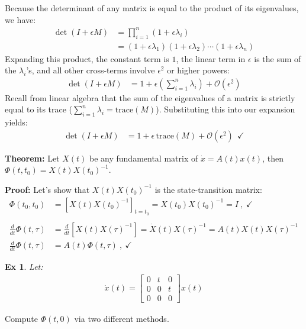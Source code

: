 \documentclass[twoside]{article}
\newtheorem{exmp}[theorem]{Ex}
\begin{document}
Because the determinant of any matrix is equal to the product of its eigenvalues, we have:
\begin{align*}
    \det(I + \epsilon M) &= \prod_{i=1}^n (1 + \epsilon \lambda_i) \\
    &= (1 + \epsilon \lambda_1)(1 + \epsilon \lambda_2) \cdots (1 + \epsilon \lambda_n) 
\end{align*}
Expanding this product, the constant term is $1$, the linear term in $\epsilon$ is the sum of the $\lambda_i$'s, and all other cross-terms involve $\epsilon^2$ or higher powers:
\begin{align*}
    \det(I + \epsilon M) &= 1 + \epsilon \left( \sum_{i=1}^n \lambda_i \right) + \mathcal{O}(\epsilon^2)
\end{align*}
Recall from linear algebra that the sum of the eigenvalues of a matrix is strictly equal to its trace ($\sum_{i=1}^n \lambda_i = \mathrm{trace}(M)$). Substituting this into our expansion yields:
\begin{align*}
    \det(I + \epsilon M) &= 1 + \epsilon \, \mathrm{trace}(M) + \mathcal{O}(\epsilon^2) \ \ \checkmark
\end{align*}
\vspace{6pt}

\textbf{Theorem:} Let $X(t)$ be any fundamental matrix of $\dot{x} = A(t) x(t)$, then $\Phi(t,t_0) = X(t) X(t_0)^{-1}$.

\textbf{Proof:} Let's show that $X(t) X(t_0)^{-1}$ is the state-transition matrix:
%
\begin{align*}
\Phi(t_0,t_0) &= \left[ X(t) X(t_0)^{-1} \right]_{t=t_0} = X(t_0) X(t_0)^{-1}= I \ , \ \checkmark
	\\
	\\
	\frac{d}{dt} \Phi(t , \tau) &= \frac{d}{dt} \left[ X(t) X(\tau)^{-1} \right] = \dot{X}(t) X(\tau)^{-1}  = A(t) X(t) X(\tau)^{-1}
	\\
	\frac{d}{dt} \Phi(t , \tau) &= A(t) \Phi(t , \tau) \ , \ \checkmark
\end{align*}

\begin{exmp}
Let:
\begin{align*}
	\dot{x}(t) = \begin{bmatrix} 0 & t & 0 \\ 0 & 0 & t \\ 0 & 0 & 0 \end{bmatrix} x(t)
\end{align*}
\end{exmp}
%
Compute $\Phi(t,0)$ via two different methods.
\end{document}
